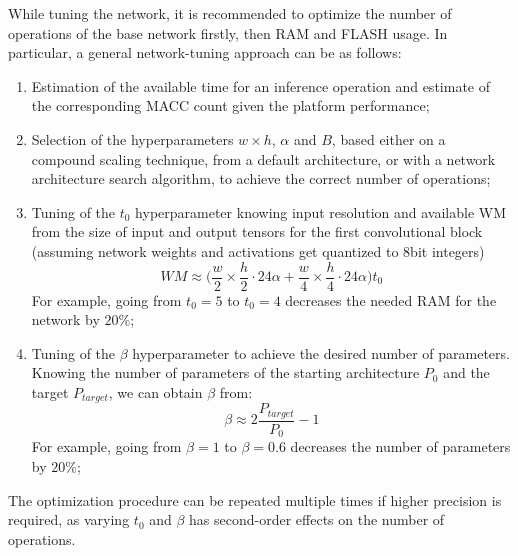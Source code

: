 While tuning the network, it is recommended to optimize the number of operations of the base network firstly, then RAM and FLASH usage. In particular, a general network-tuning approach can be as follows:
\begin{enumerate}
    \item Estimation of the available time for an inference operation and estimate of the corresponding MACC count given the platform performance;
    \item Selection of the hyperparameters $w\times h$, $\alpha$ and $B$, based either on a compound scaling technique, from a default architecture, or with a network architecture search algorithm, to achieve the correct number of operations;
    \item Tuning of the $t_0$ hyperparameter knowing input resolution and available WM from the size of input and output tensors for the first convolutional block (assuming network weights and activations get quantized to 8bit integers)
\begin{equation*}
    WM\approx \bigg(\frac{w}{2}\times\frac{h}{2}\cdot 24\alpha + \frac{w}{4}\times\frac{h}{4}\cdot 24\alpha \bigg) t_0
\end{equation*}
    For example, going from $t_0=5$ to $t_0=4$ decreases the needed RAM for the network by $20\%$;
    \item Tuning of the $\beta$ hyperparameter to achieve the desired number of parameters. Knowing the number of parameters of the starting architecture $P_0$ and the target $P_{target}$, we can obtain $\beta$ from:
\begin{equation*}
    \beta \approx 2\frac{P_{target}}{P_0}-1
\end{equation*}
    For example, going from $\beta=1$ to $\beta=0.6$ decreases the number of parameters by $20\%$;
\end{enumerate}
The optimization procedure can be repeated multiple times if higher precision is required, as varying $t_0$ and $\beta$ has second-order effects on the number of operations.


